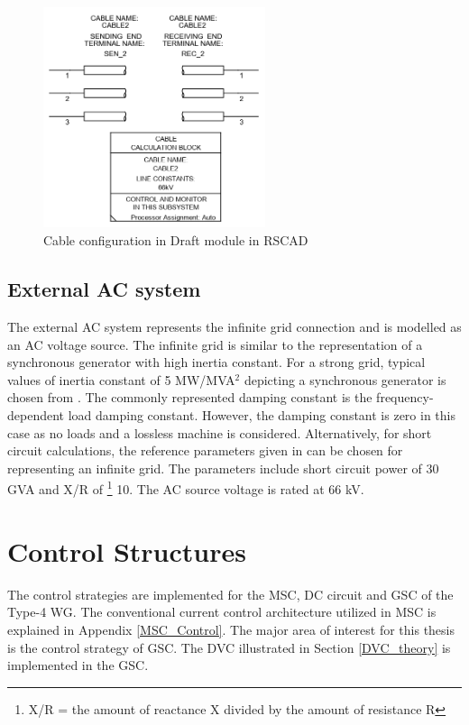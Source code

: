 \begin{figure}[H]
  \centering
  \includegraphics[height = 6.5cm,width = 6.5cm]{Diagrams/Chapter_3/CableParaBlock.PNG}  
  \caption{Cable configuration in Draft module in RSCAD}
  \label{fig:CableParaBlock}
\end{figure}

\subsection{External AC system}\label{ext_AC_source}
The external \gls{AC} system represents the infinite grid connection and is modelled as an \gls{AC} voltage source. The infinite grid is similar to the representation of a synchronous generator with high inertia constant. For a strong grid, typical values of inertia constant of 5 MW/MVA$^2$ depicting a synchronous generator is chosen from \cite{kothari2003modern}. The commonly represented damping constant is the frequency-dependent load damping constant. However, the damping constant is zero in this case as no loads and a lossless machine is considered. Alternatively, for short circuit calculations, the reference parameters given in \cite{wachal2014guide} can be chosen for representing an infinite grid. The parameters include short circuit power of 30 GVA and X/R of \footnote{X/R = the amount of reactance X divided by the amount of resistance R} 10. The \gls{AC} source voltage is rated at 66 kV.

\section{Control Structures}
The control strategies are implemented for the \gls{MSC}, \gls{DC} circuit and \gls{GSC} of the Type-4 \gls{WG}. The conventional current control architecture utilized in \gls{MSC} is explained in Appendix \ref{MSC_Control}. The major area of interest for this thesis is the control strategy of \gls{GSC}. The \gls{DVC} illustrated in Section \ref{DVC_theory} is implemented in the \gls{GSC}.   

